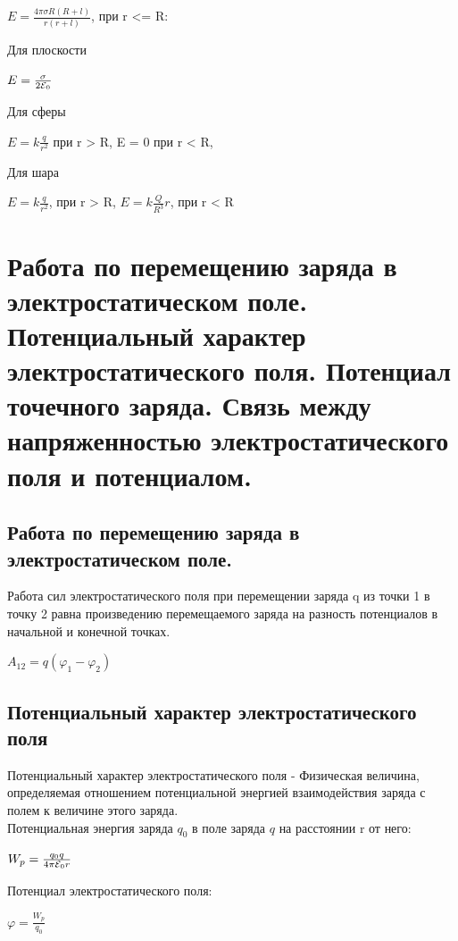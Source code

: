 \documentclass[12pt]{report}
\begin{document}
\begin{center}
    $E   = \frac{4 \pi \sigma  R(R + l)}{r(r + l)}$, при r <= R:
\end{center}
\par Для плоскости
\begin{center}
    $E = \frac{\sigma}{2 \varE_0} $
\end{center}
\par  Для сферы
\begin{center}
    $E = k \frac{q}{r^2}$ при r > R, E = 0 при r < R,
\end{center}
\par Для шара
\begin{center}
    $E = k \frac{q}{r^2}$, при r > R, $E = k \frac{Q}{R^3}r$, при r < R
\end{center}
\section{Работа по перемещению заряда в электростатическом поле. Потенциальный характер электростатического поля. Потенциал точечного заряда. Связь между напряженностью электростатического поля и потенциалом.}
\subsection{Работа по перемещению заряда в электростатическом поле.}
Работа сил электростатического поля
при перемещении заряда q из точки 1 в
точку 2 равна произведению перемещаемого заряда на разность
потенциалов в начальной и конечной точках.
\begin{center}
    $A_{12} = q (\varphi_1 - \varphi_2)$
\end{center}
\subsection{Потенциальный характер электростатического поля}
Потенциальный характер электростатического поля - Физическая величина, определяемая
отношением потенциальной энергией
взаимодействия заряда с полем к величине
этого заряда.\\
Потенциальная энергия заряда $q_0$ в поле
заряда $q$ на расстоянии r от него:
\begin{center}
    $W_p = \frac{q_0 q}{4 \pi \varE_0 r}$
\end{center}
\par Потенциал электростатического поля:
\begin{center}
    $\varphi =  \frac{W_p}{q_0}$
\end{center}
\end{document}
